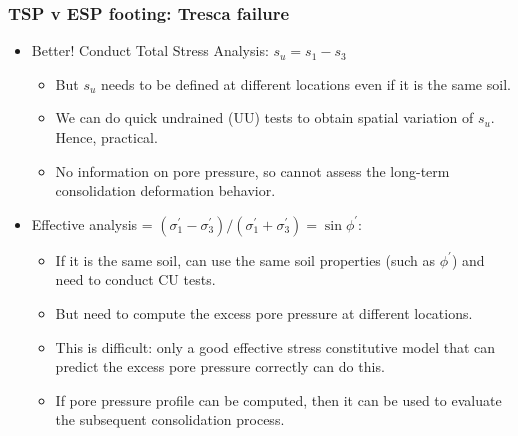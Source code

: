 \documentclass[notes]{beamer}
\begin{document}
\begin{frame}
\frametitle{TSP v ESP footing: Tresca failure}
\begin{itemize}
	\item Better! Conduct Total Stress Analysis: $s_u = s_1 - s_3$
	\begin{itemize}
		\item But $s_u$ needs to be defined at different locations even if it is the same
		soil.
		\item We can do quick undrained (UU) tests to obtain spatial variation of
		$s_u$. Hence, practical.
		\item No information on pore pressure, so cannot assess the long-term consolidation deformation behavior.
	\end{itemize}
	\item Effective analysis = $(\sigma_1^\prime - \sigma_3^\prime)/(\sigma_1^\prime + \sigma_3^\prime) = \sin \phi^\prime$:
	\begin{itemize}
		\item If it is the same soil, can use the same soil properties (such as $\phi^\prime$)
		and need to conduct CU tests.
		\item But need to compute the excess pore pressure at different locations.
		\item This is difficult: only a good effective stress constitutive model that
		can predict the excess pore pressure correctly can do this.
		\item If pore pressure profile can be computed, then it can be used to
		evaluate the subsequent consolidation process.
	\end{itemize}
\end{itemize}
\end{frame}
\end{document}
